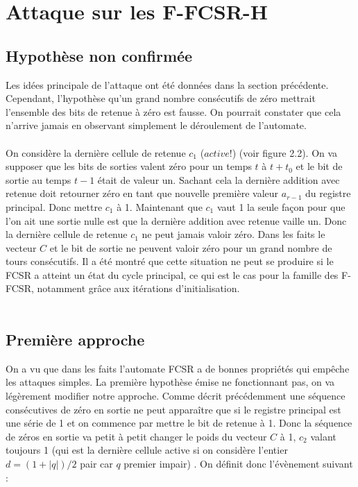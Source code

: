 \documentclass[11pt]{report}
\begin{document}
\section{Attaque sur les F-FCSR-H}
\subsection{Hypothèse non confirmée}

Les idées principale de l'attaque ont été données dans la section précédente. Cependant, l'hypothèse qu'un grand nombre consécutifs de zéro mettrait l'ensemble des bits de retenue à zéro est fausse. On pourrait constater que cela n'arrive jamais en observant simplement le déroulement de l'automate. 
\\\\
On considère la dernière cellule de retenue $c_1$ ($active$!) (voir figure 2.2). On va supposer que les bits de sorties valent zéro pour un temps $t$ à $t+t_0$ et le bit de sortie au temps $t-1$ était de valeur un. Sachant cela la dernière addition avec retenue doit retourner zéro en tant que nouvelle première valeur $a_{r-1}$ du registre principal. Donc mettre $c_1$ à 1. Maintenant que $c_1$ vaut 1 la seule façon pour que l'on ait une sortie nulle est que la dernière addition avec retenue vaille un. Donc la dernière cellule de retenue $c_1$ ne peut jamais valoir zéro. Dans les faits le vecteur $C$ et le bit de sortie ne peuvent valoir zéro pour un grand nombre de tours consécutifs. Il a été montré que cette situation ne peut se produire si le FCSR a atteint un état du cycle principal, ce qui est le cas pour la famille des F-FCSR, notamment grâce aux itérations d'initialisation. 
\\\\
\subsection{Première approche}

On a vu que dans les faits l'automate FCSR a de bonnes propriétés qui empêche les attaques simples. La première hypothèse émise ne fonctionnant pas, on va légèrement modifier notre approche. Comme décrit précédemment une séquence consécutives de zéro en sortie ne peut apparaître que si le registre principal est une série de 1 et on commence par mettre le bit de retenue à 1. Donc la séquence de zéros en sortie va petit à petit changer le poids du vecteur $C$ à 1, $c_2$ valant toujours 1 (qui est la dernière cellule active si on considère l'entier $d= (1+|q|)/2$ pair car $q$ premier impair) . On définit donc l'évènement suivant : 
\end{document}

